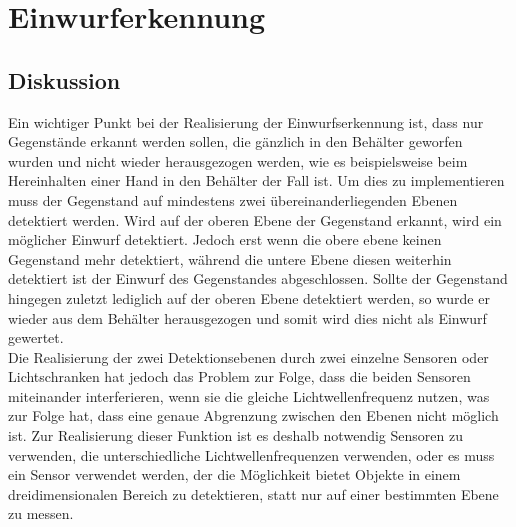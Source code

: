 \section{Einwurferkennung}
    \subsection{Diskussion}
        Ein wichtiger Punkt bei der Realisierung der Einwurfserkennung ist, dass nur Gegenstände erkannt werden sollen, die gänzlich in den Behälter geworfen wurden und nicht wieder herausgezogen werden, wie es beispielsweise beim Hereinhalten einer Hand in den Behälter der Fall ist. Um dies zu implementieren muss der Gegenstand auf mindestens zwei übereinanderliegenden Ebenen detektiert werden. Wird auf der oberen Ebene der Gegenstand erkannt, wird ein möglicher Einwurf detektiert. Jedoch erst wenn die obere ebene keinen Gegenstand mehr detektiert, während die untere Ebene diesen weiterhin detektiert ist der Einwurf des Gegenstandes abgeschlossen. Sollte der Gegenstand hingegen zuletzt lediglich auf der oberen Ebene detektiert werden, so wurde er wieder aus dem Behälter herausgezogen und somit wird dies nicht als Einwurf gewertet.\\

        Die Realisierung der zwei Detektionsebenen durch zwei einzelne Sensoren oder Lichtschranken hat jedoch das Problem zur Folge, dass die beiden Sensoren miteinander interferieren, wenn sie die gleiche Lichtwellenfrequenz nutzen, was zur Folge hat, dass eine genaue Abgrenzung zwischen den Ebenen nicht möglich ist. Zur Realisierung dieser Funktion ist es deshalb notwendig Sensoren zu verwenden, die unterschiedliche Lichtwellenfrequenzen verwenden, oder es muss ein Sensor verwendet werden, der die Möglichkeit bietet Objekte in einem dreidimensionalen Bereich zu detektieren, statt nur auf einer bestimmten Ebene zu messen.\\

